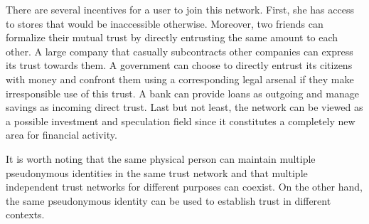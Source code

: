   There are several incentives for a user to join this network. First, she has access to stores that would be inaccessible
  otherwise. Moreover, two friends can formalize their mutual trust by directly entrusting the same amount to each other. A
  large company that casually subcontracts other companies can express its trust towards them. A government can choose to
  directly entrust its citizens with money and confront them using a corresponding legal arsenal if they make irresponsible
  use of this trust. A bank can provide loans as outgoing and manage savings as incoming direct trust. Last but not least,
  the network can be viewed as a possible investment and speculation field since it constitutes a completely new area for
  financial activity.

  It is worth noting that the same physical person can maintain multiple pseudonymous identities in the same trust network
  and that multiple independent trust networks for different purposes can coexist. On the other hand, the same pseudonymous
  identity can be used to establish trust in different contexts.
